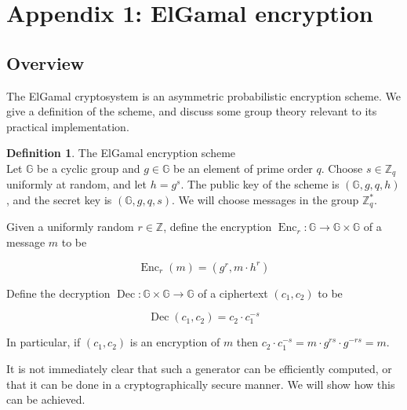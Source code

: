 \documentclass[11pt,twoside,a4paper]{article}
\DeclareMathOperator{\Enc}{Enc}
\DeclareMathOperator{\Dec}{Dec}
\theoremstyle{definition}
\newtheorem{definition}{Definition}[section]
\begin{document}
\section{Appendix 1: ElGamal encryption}\label{app-elgamal}
\subsection{Overview}
The ElGamal cryptosystem is an asymmetric probabilistic encryption scheme. We give a definition of the scheme, and discuss some group theory relevant to its practical implementation.
\begin{definition}{The ElGamal encryption scheme}\\
    Let \(\mathbb{G}\) be a cyclic group and \(g\in\mathbb{G}\) be an element of prime order \(q\). Choose \(s\in\mathbb{Z}_q\) uniformly at random, and let \(h=g^s\). The public key of the scheme is \((\mathbb{G}, g, q, h)\), and the secret key is \((\mathbb{G}, g, q, s)\). We will choose messages in the group \(\mathbb{Z}^*_q\).

    Given a uniformly random \(r\in\mathbb{Z}\), define the encryption \(\Enc_r:\mathbb{G}\rightarrow\mathbb{G}\times\mathbb{G}\) of a message \(m\) to be
    
    \[\Enc_r(m) = (g^r, m\cdot h^r)\]

    Define the decryption \(\Dec:\mathbb{G}\times\mathbb{G}\rightarrow \mathbb{G}\) of a ciphertext \((c_1, c_2)\) to be
    
    \[\Dec(c_1,c_2)=c_2\cdot c_1^{-s}\]

    In particular, if \((c_1,c_2)\) is an encryption of \(m\) then \(c_2\cdot c_1^{-s}=m\cdot g^{rs}\cdot g^{-rs}=m\).
\end{definition}
It is not immediately clear that such a generator can be efficiently computed, or that it can be done in a cryptographically secure manner. We will show how this can be achieved.
\end{document}
